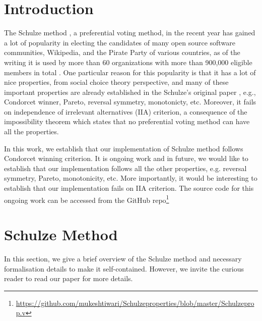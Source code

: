 \documentclass[compsoc,conference,a4paper,10pt,times]{IEEEtran}
\begin{document}
\section{Introduction}
    The Schulze method \cite{Schulze:2011:NMC}, a preferential voting method, in the recent year 
    has gained a lot of popularity in electing the candidates of many open source 
    software communities, Wikipedia, and the Pirate Party of various countries, as of the writing it 
    is used by more  than  60 organizations  with  more  than  900,000  eligible  
    members  in  total \cite{schulze2020schulze}. One particular reason for this popularity is that it 
    has a lot of nice properties, from social choice theory perspective, and many of 
    these important properties are already established in the Schulze's original paper \cite{Schulze:2011:NMC}, e.g., Condorcet winner, Pareto, reversal symmetry, monotonicty, 
    etc. Moreover, it fails on independence of 
    irrelevant alternatives (IIA) criterion, a consequence of the impossibility theorem \cite{arrow1950difficulty} which states that no preferential voting 
    method can have all the properties. 

    In this work, we establish that our implementation of Schulze method \cite{Pattinson:2017:SVE}
    follows Condorcet winning criterion. It is ongoing work and in  
    future, we would like to establish that our implementation follows all the other properties, 
    e.g. reversal symmetry, Pareto, monotonicity, etc. 
    More importantly, it would be interesting to establish that our implementation 
    fails on IIA criterion. The 
    source code for this ongoing work can be accessed from the GitHub 
    repo\footnote{\url{https://github.com/mukeshtiwari/Schulzeproperties/blob/master/Schulzeprop.v}}
    
    \section{Schulze Method}
    In this section, we give a brief overview of the Schulze method and 
    necessary formalisation details to make it self-contained. However, we invite the 
    curious reader to read our paper \cite{Pattinson:2017:SVE} for more details. 
    
\end{document}

